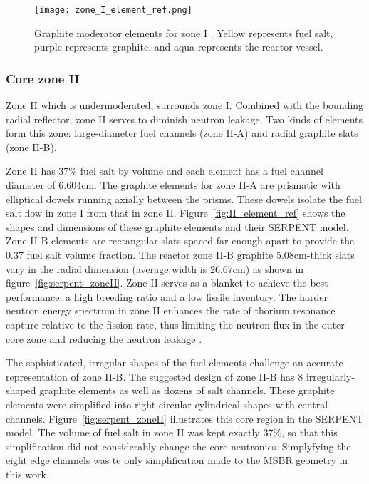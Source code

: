 \begin{figure}[ht!] %
  \texttt{[image: zone\_I\_element\_ref.png]}
  \caption{Graphite moderator elements for zone I 
  \cite{robertson_conceptual_1971,rykhlevskii_full-core_2017}.  Yellow 
  represents fuel salt, purple represents graphite, and aqua represents the 
  reactor vessel.}
  \label{fig:I_element_ref}
\end{figure}

\subsubsection{Core zone II}
Zone II which is undermoderated, surrounds zone I. Combined with the bounding 
radial reflector, zone II serves to diminish neutron leakage. Two kinds of 
elements form this zone: large-diameter fuel channels (zone II-A) and 
radial graphite slats (zone II-B). 

Zone II has 37\% fuel salt by volume and each element has a fuel channel 
diameter of 6.604cm. The graphite elements for zone II-A are prismatic with
elliptical dowels running axially between the prisms. These dowels
isolate the fuel salt flow in zone I from that in zone II. 
Figure~\ref{fig:II_element_ref} shows the shapes and dimensions of these graphite 
elements and their SERPENT model. Zone II-B elements are rectangular slats 
spaced far enough apart to provide the 0.37 fuel salt volume fraction. The 
reactor zone II-B graphite 5.08cm-thick slats vary in the radial dimension 
(average width is 26.67cm) as shown in figure~\ref{fig:serpent_zoneII}. Zone II 
serves as a blanket to achieve the best performance: a high breeding ratio and 
a low fissile inventory. The harder neutron energy spectrum in zone II 
enhances the rate of thorium resonance capture relative to the fission rate, 
thus limiting the neutron flux in the outer core zone and reducing the neutron 
leakage \cite{robertson_conceptual_1971}. 

The sophisticated, irregular shapes of the fuel elements challenge an accurate 
representation of zone II-B.  
The suggested design \cite{robertson_conceptual_1971} of zone II-B has 8 
irregularly-shaped graphite elements as well as dozens of salt channels. 
These graphite elements were simplified into right-circular cylindrical shapes  
with central channels. Figure~\ref{fig:serpent_zoneII} illustrates this core 
region in the SERPENT model. The volume of fuel salt in zone II was kept 
exactly 37\%, so that this simplification did not considerably change the core 
neutronics. Simplyfying the eight edge channels was te only simplification made 
to the \gls{MSBR} geometry in this work. 

